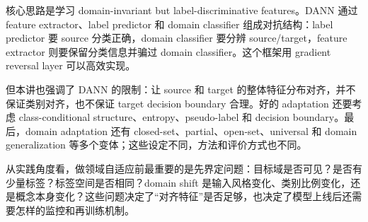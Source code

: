 \documentclass[a4paper]{article}
\begin{document}
核心思路是学习 domain-invariant but label-discriminative features。DANN 通过 feature extractor、label predictor 和 domain classifier 组成对抗结构：label predictor 要 source 分类正确，domain classifier 要分辨 source/target，feature extractor 则要保留分类信息并骗过 domain classifier。这个框架用 gradient reversal layer 可以高效实现。

但本讲也强调了 DANN 的限制：让 source 和 target 的整体特征分布对齐，并不保证类别对齐，也不保证 target decision boundary 合理。好的 adaptation 还要考虑 class-conditional structure、entropy、pseudo-label 和 decision boundary。最后，domain adaptation 还有 closed-set、partial、open-set、universal 和 domain generalization 等多个变体；这些设定不同，方法和评价方式也不同。

从实践角度看，做领域自适应前最重要的是先界定问题：目标域是否可见？是否有少量标签？标签空间是否相同？domain shift 是输入风格变化、类别比例变化，还是概念本身变化？这些问题决定了“对齐特征”是否足够，也决定了模型上线后还需要怎样的监控和再训练机制。
\end{document}
